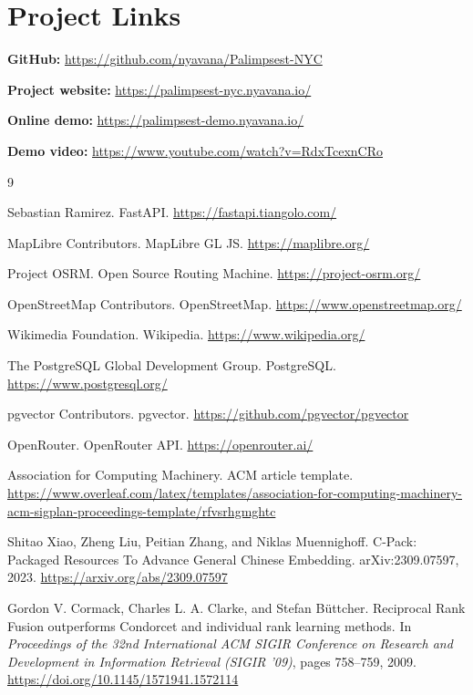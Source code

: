 \documentclass[sigconf,nonacm]{acmart}
\begin{document}
\section*{Project Links}
\noindent\textbf{GitHub:} \url{https://github.com/nyavana/Palimpsest-NYC}

\noindent\textbf{Project website:} \url{https://palimpsest-nyc.nyavana.io/}

\noindent\textbf{Online demo:} \url{https://palimpsest-demo.nyavana.io/}

\noindent\textbf{Demo video:} \url{https://www.youtube.com/watch?v=RdxTcexnCRo}

\begin{thebibliography}{9}

Sebastian Ramirez.
\newblock FastAPI.
\newblock \url{https://fastapi.tiangolo.com/}

MapLibre Contributors.
\newblock MapLibre GL JS.
\newblock \url{https://maplibre.org/}

Project OSRM.
\newblock Open Source Routing Machine.
\newblock \url{https://project-osrm.org/}

OpenStreetMap Contributors.
\newblock OpenStreetMap.
\newblock \url{https://www.openstreetmap.org/}

Wikimedia Foundation.
\newblock Wikipedia.
\newblock \url{https://www.wikipedia.org/}

The PostgreSQL Global Development Group.
\newblock PostgreSQL.
\newblock \url{https://www.postgresql.org/}

pgvector Contributors.
\newblock pgvector.
\newblock \url{https://github.com/pgvector/pgvector}

OpenRouter.
\newblock OpenRouter API.
\newblock \url{https://openrouter.ai/}

Association for Computing Machinery.
\newblock ACM article template.
\newblock \url{https://www.overleaf.com/latex/templates/association-for-computing-machinery-acm-sigplan-proceedings-template/rfvsrhgmghtc}

Shitao Xiao, Zheng Liu, Peitian Zhang, and Niklas Muennighoff.
\newblock C-Pack: Packaged Resources To Advance General Chinese Embedding.
\newblock arXiv:2309.07597, 2023.
\newblock \url{https://arxiv.org/abs/2309.07597}

Gordon V. Cormack, Charles L. A. Clarke, and Stefan B\"{u}ttcher.
\newblock Reciprocal Rank Fusion outperforms Condorcet and individual rank learning methods.
\newblock In \emph{Proceedings of the 32nd International ACM SIGIR Conference on Research and Development in Information Retrieval (SIGIR '09)}, pages 758--759, 2009.
\newblock \url{https://doi.org/10.1145/1571941.1572114}


\end{thebibliography}
\end{document}
